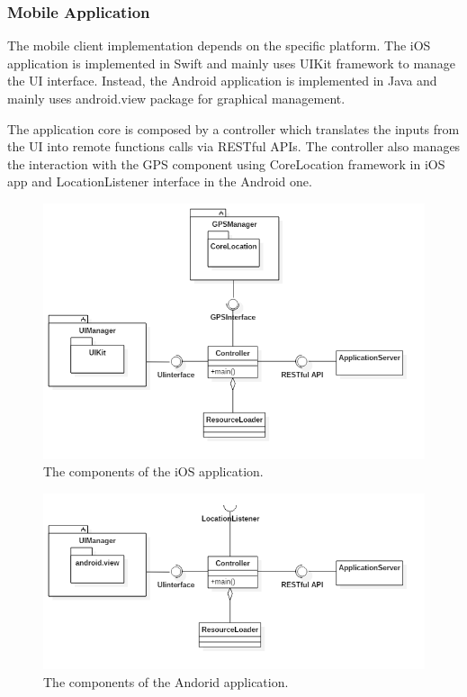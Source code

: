 \subsubsection{Mobile Application}

The mobile client implementation depends on the specific platform. 
The iOS application is implemented in Swift and mainly uses UIKit framework to manage the UI interface.
Instead, the Android application is implemented in Java and mainly uses android.view package for graphical management.

The application core is composed by a controller which translates the inputs from the UI into remote functions calls via  RESTful APIs. The controller also manages the interaction with the GPS component using  CoreLocation framework in iOS app and LocationListener interface in the Android one.

\begin{figure}[H]
    \centering
    \includegraphics[width=\textwidth, keepaspectratio]{diagrams/iOS.png}
    \caption{The components of the iOS application.}
    \label{fig:ios-app}
\end{figure}

\begin{figure}[H]
    \centering
    \includegraphics[width=\textwidth, keepaspectratio]{diagrams/Android.png}
    \caption{The components of the Andorid application.}
    \label{fig:android-app}
\end{figure}

